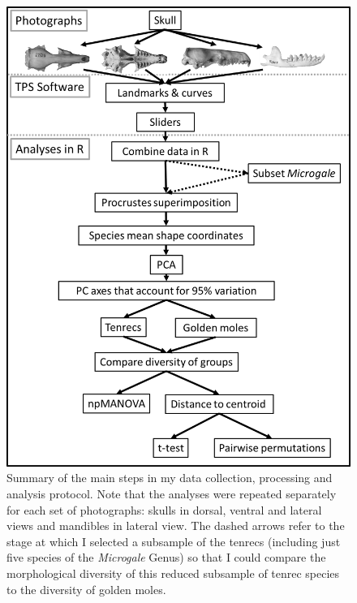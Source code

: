 		\begin{figure}[!htbp]
		\centering
		\includegraphics[width=1\linewidth,height=0.8\textheight]{Disparity/writing/figures/Methods_flowchart_thesis.png}
		
		\caption[Flowchart diagram of data collection and analysis]
			{Summary of the main steps in my data collection, processing and analysis protocol. Note that the analyses were repeated separately for each set of photographs: skulls in dorsal, ventral and lateral views and mandibles in lateral view. The dashed arrows refer to the stage at which I selected a subsample of the tenrecs (including just five species of the \textit{Microgale} Genus) so that I could compare the morphological diversity of this reduced subsample of tenrec species to the diversity of golden moles.}
		
		\label{fig:flow}
		\end{figure}


